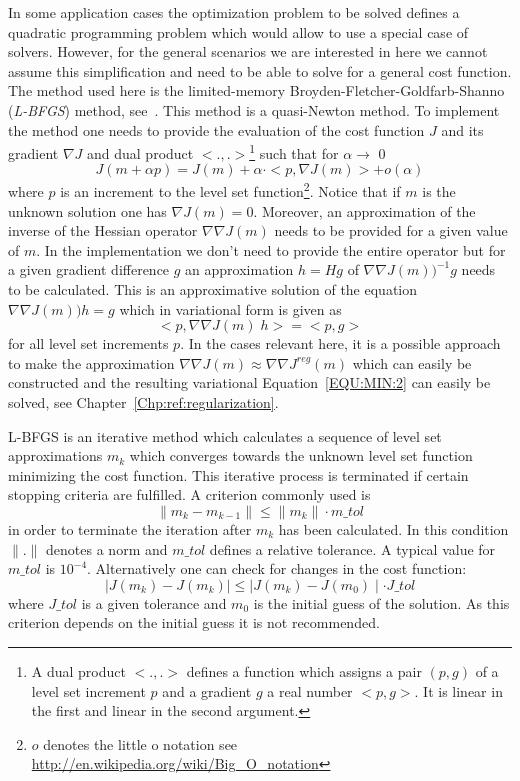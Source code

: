 In some application cases the optimization problem to be solved defines a
quadratic programming problem which would allow to use a special case of
solvers.
However, for the general scenarios we are interested in here we cannot assume
this simplification and need to be able to solve for a general cost function.
The method used here is the limited-memory Broyden-Fletcher-Goldfarb-Shanno
(\emph{L-BFGS}) method, see~\cite{Nocedal1980}.
This method is a quasi-Newton method.
To implement the method one needs to provide the evaluation of the cost
function $J$ and its gradient $\nabla J$ and dual product $<.,.>$\footnote{A
dual product $<.,.>$ defines a function which assigns a pair $(p,g)$ of a level
set increment $p$ and a gradient $g$ a real number $<p,g>$. It is linear
in the first and linear in the second argument.}
such that for $\alpha \to$ 0 
\begin{equation}\label{EQU:MIN:1}
J(m+\alpha p) = J(m) + \alpha \cdot < p , \nabla J(m)> + o(\alpha)
\end{equation}  
where $p$ is an increment to the level set function\footnote{$o$ denotes the
little o notation see \url{http://en.wikipedia.org/wiki/Big_O_notation}}.
Notice that if $m$ is the unknown solution one has $\nabla J(m)=0$.
Moreover, an approximation of the inverse of the Hessian operator
$\nabla \nabla J(m)$ needs to be provided for a given value of $m$.
In the implementation we don't need to provide the entire operator but for a
given gradient difference $g$ an approximation $h=Hg$ of
$\nabla \nabla J(m))^{-1}g$ needs to be calculated.
This is an approximative solution of the equation $\nabla \nabla J(m)) h=g$
which in variational form is given as 
\begin{equation}\label{EQU:MIN:2}
<p, \nabla \nabla J(m)\; h > = <p, g>
\end{equation}
for all level set increments $p$.
In the cases relevant here, it is a possible approach to make the approximation
$\nabla \nabla J(m) \approx \nabla \nabla J^{reg}(m)$ which can easily be
constructed and the resulting variational Equation~\ref{EQU:MIN:2} can easily
be solved, see Chapter~\ref{Chp:ref:regularization}.

L-BFGS is an iterative method which calculates a sequence of level set
approximations $m_{k}$ which converges towards the unknown level set function
minimizing the cost function.
This iterative process is terminated if certain stopping criteria are fulfilled.
A criterion commonly used is
\begin{equation}\label{EQU:MIN:3a}
\| m_k - m_{k-1} \| \le \|m_k\| \cdot {m\_tol} 
\end{equation}
in order to terminate the iteration after $m_k$ has been calculated.
In this condition $\|.\|$ denotes a norm and $m\_tol$ defines a relative
tolerance. A typical value for $m\_tol$ is $10^{-4}$. Alternatively one can
check for changes in the cost function:
\begin{equation}\label{EQU:MIN:3b}
\mid J(m_k) - J(m_k) \mid \le \mid J(m_k) - J(m_0) \mid \cdot {J\_tol}  
\end{equation}
where ${J\_tol}$ is a given tolerance and $m_0$ is the initial guess of the solution.
As this criterion depends on the initial guess it is not recommended.


